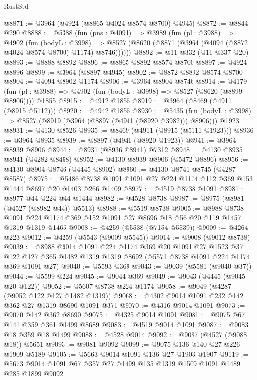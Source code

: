 \begin{lexlean}{RustStd}
\begin{coremodule}
@8871 := @3964 (@4924 (@8865 @4024 @8574 @8700) @4945)
@8872 := @8844 @290
@8888 := @5388
    (fun (pns : @4091) =>
    @3989
      (fun (pl : @3988) =>
      @4902
        (fun (bodyL : @3998) =>
        @8527 (@8620 (@8871 (@3964 (@4094 (@8872 @4024 @8574 @8700) @1174) @8746))))))
@8892 := @11 @332 (@11 @337 @20)
@8893 := @8888 @8892
@8896 := @8865 @8892 @8574 @8700
@8897 := @4924 @8896
@8899 := @3964 (@8897 @4945)
@8902 := @8872 @8892 @8574 @8700
@8904 := @4094 @8902 @1174
@8906 := @3964 @8904 @8746
@8914 := @4179
    (fun (pl : @3988) => @4902 (fun (bodyL : @3998) => @8527 (@8620 (@8899 @8906))))
    @1855
@8915 := @4912 @1855
@8919 := @3964 (@8469 (@4911 (@8915 @5112)))
@8920 := @4942 @1855
@8930 := @5435
    (fun (bodyL : @3998) => @8527 (@8919 (@3964 (@8897 (@4941 (@8920 @3982))) @8906)))
    @1923
@8931 := @4130 @8526
@8935 := @8469 (@4911 (@8915 (@5111 @1923)))
@8936 := @3964 @8935
@8939 := @8897 (@4941 (@8920 @1923))
@8941 := @3964 @8939 @8906
@8944 := @8931 (@8936 @8941) @7312
@8948 := @4130 @8935 @8941 (@4282 @8468)
@8952 := @4130 @8939 @8906 (@5472 @8896)
@8956 := @4130 @8904 @8746 (@4445 @8902)
@8960 := @4130 @8741 @8745 (@4287 @8587)
@8975 := @5486 @8738 @1091 @1091 @27 @224 @1174 @112 @369 @153 @1444 @8697 @20 @1403 @266 @1409
@8977 := @4519 @8738 @1091
@8981 := @8977 @44 @224 @44 @1444
@8982 := @4528 @8738
@8987 := @8975 (@8981 (@4527 (@8982 @44)) @5513)
@8988 := @5519 @8738
@9005 := @8988
    @8738
    @1091
    @224
    @1174
    @369
    @152
    @1091
    @27
    @8696
    @18
    @56
    @20
    @119
    @1457
    @1319
    @1319
    @1465
@9008 := @4259 (@5538 (@7154 @5539))
@9009 := @4264 @223
@9012 := @4259 (@5543 (@9009 @5545))
@9014 := @9008 (@9012 @8738)
@9039 := @8988
    @9014
    @1091
    @224
    @1174
    @369
    @20
    @1091
    @27
    @1523
    @37
    @122
    @127
    @365
    @1482
    @1319
    @1319
    @8692
    (@5571 @8738 @1091 @224 @1174 @369 @1091 @27)
@9040 := @5593 @369
@9043 := @9039 (@5581 (@9040 @37))
@9044 := @5599 @224
@9045 := @9044 @369
@9049 := @9043 (@4445 (@9045 @20 @122))
@9052 := @5607 @8738 @224 @1174
@9058 := @9049 (@4287 (@9052 @122 @127 @1482 @1319))
@9068 := @4302 @9014 @1091 @232 @142 @362 @27 @1319 @8690 @1091 @371
@9070 := @4316 @9014 @1091
@9073 := @9070 @142 @362 @8690
@9075 := @4325 @9014 @1091
@9081 := @9075 @67 @141 @359 @361 @1499 @8689
@9083 := @4519 @9014 @1091
@9087 := @9083 @18 @359 @18 @1499
@9088 := @4528 @9014
@9092 := @9087 (@4527 (@9088 @18)) @5651
@9093 := @9081 @9092
@9099 := @9075 @136 @140 @27 @226 @1909 @5189
@9105 := @5663 @9014 @1091 @136 @27 @1903 @1907
@9119 := @5673 @9014 @1091 @67 @357 @27 @1499 @135 @1319 @1509 @1091 @1489 @285 @1899 @9092

\end{coremodule}
\end{lexlean}
